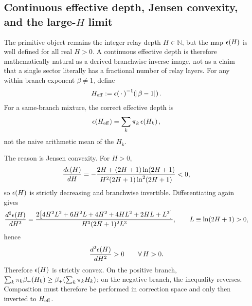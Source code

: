 \subsection{Continuous effective depth, Jensen convexity, and the large-\(H\) limit}

The primitive object remains the integer relay depth \(H\in\mathbb{N}\),
but the map \(\epsilon\!\left(H\right)\) is well defined for all real \(H>0\).
A continuous effective depth is therefore mathematically natural as a derived
branchwise inverse image, not as a claim that a single sector literally
has a fractional number of relay layers.
For any within-branch exponent \(\beta\neq 1\), define
\begin{equation}
H_{\mathrm{eff}}:=\epsilon\!\left(\,\cdot\,\right)^{-1}\!\left(\left|\beta-1\right|\right).
\label{eq:Heff}
\end{equation}
For a same-branch mixture, the correct effective depth is
\begin{equation}
\epsilon\!\left(H_{\mathrm{eff}}\right)=\sum_k \pi_k\,\epsilon\!\left(H_k\right),
\label{eq:Heffmix}
\end{equation}
not the naive arithmetic mean of the \(H_k\).

The reason is Jensen convexity.
For \(H>0\),
\begin{equation}
\frac{d\epsilon\!\left(H\right)}{dH}=
-\frac{2H+(2H+1)\ln(2H+1)}
 {H^{2}(2H+1)\ln^{2}(2H+1)}<0,
\label{eq:epsprime}
\end{equation}
so \(\epsilon\!\left(H\right)\) is strictly decreasing and branchwise invertible.
Differentiating again gives
\begin{equation}
\frac{d^{2}\epsilon\!\left(H\right)}{dH^{2}}=
\frac{2\!\left[4H^{2}L^{2}+6H^{2}L+4H^{2}+4HL^{2}+2HL+L^{2}\right]}
 {H^{3}(2H+1)^{2}L^{3}},\qquad L\equiv \ln(2H+1)>0,
\label{eq:epssecond}
\end{equation}
hence
\begin{equation}
\frac{d^{2}\epsilon\!\left(H\right)}{dH^{2}}>0 \qquad \forall\,H>0.
\label{eq:jensen_prop}
\end{equation}
Therefore \(\epsilon\!\left(H\right)\) is strictly convex.
On the positive branch,
\(\sum_k \pi_k\beta_+\!\left(H_k\right)\ge \beta_+\!\left(\sum_k \pi_kH_k\right)\);
on the negative branch, the inequality reverses.
Composition must therefore be performed in correction space and only then
inverted to \(H_{\mathrm{eff}}\).

